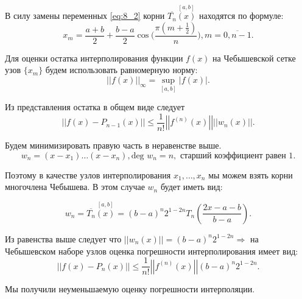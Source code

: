 В силу замены переменных \eqref{eq:8_2} корни $\overline{T_n}\overset{[a, b]}{(x)}$ находятся по формуле:
\begin{equation*}
  x_m = \dfrac{a+b}{2} + \dfrac{b-a}{2} \cos \Big( \dfrac{\pi (m + \frac{1}{2})}{n} \Big), m = \overline{0, n-1}.
\end{equation*}

Для оценки остатка интерполирования функции $f(x)$ на Чебышевской сетке узов $\{ x_m \}$ будем использовать равномерную норму:
\begin{equation*}
  \left| \left| f(x) \right| \right|_{\infty} = \sup\limits_{[a, b]} |f(x)|.
\end{equation*}

Из представления остатка в общем виде следует
\begin{equation*}
  \left| \left| f(x) - P_{n-1}(x) \right| \right| \leqslant \dfrac{1}{n!} \left| \left| f^{(n)}(x) \right| \right|  \left| \left| w_n(x) \right| \right|.
\end{equation*}

Будем минимизировать правую часть в неравенстве выше.
\begin{equation*}
  w_n = (x - x_1) \ldots (x - x_n), \text{deg }w_n = n, \text{ старший коэффициент равен 1}.
\end{equation*}

Поэтому в качестве узлов интерполирования $x_1, \ldots, x_n$ мы можем взять корни многочлена Чебышева. В этом случае $w_n$ будет иметь вид:

\begin{equation*}
  w_n = \overline{T_n}\overset{[a, b]}{(x)} = (b - a)^n 2^{1-2n} T_n \left( \dfrac{2x - a - b}{b - a} \right).
\end{equation*}

Из равенства выше следует что $|| w_n (x) || = (b - a)^n 2^{1-2n} \Rightarrow$ на Чебышевском наборе узлов оценка погрешности интерполирования имеет вид:
\begin{equation*}
  \left| \left| f(x) - P_{n}(x) \right| \right| \leqslant \dfrac{1}{n!} \left| \left| f^{(n)}(x) \right| \right| (b - a)^n 2^{1-2n}.
\end{equation*}

Мы получили неуменьшаемую оценку погрешности интерполяции.

